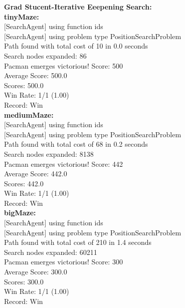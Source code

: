 \documentclass[11pt]{article}
\begin{document}
\newpage
\noindent
\textbf{Grad Stucent-Iterative Eeepening Search:}\\
\textbf{tinyMaze:}\\
$[$SearchAgent$]$ using function ids\\
$[$SearchAgent$]$ using problem type PositionSearchProblem\\
Path found with total cost of 10 in 0.0 seconds\\
Search nodes expanded: 86\\
Pacman emerges victorious! Score: 500\\
Average Score: 500.0\\
Scores:        500.0\\
Win Rate:      1/1 (1.00)\\
Record:        Win\\

\noindent
\textbf{mediumMaze:}\\
$[$SearchAgent$]$ using function ids\\
$[$SearchAgent$]$ using problem type PositionSearchProblem\\
Path found with total cost of 68 in 0.2 seconds\\
Search nodes expanded: 8138\\
Pacman emerges victorious! Score: 442\\
Average Score: 442.0\\
Scores:        442.0\\
Win Rate:      1/1 (1.00)\\
Record:        Win\\

\noindent
\textbf{bigMaze:}\\
$[$SearchAgent$]$ using function ids\\
$[$SearchAgent$]$ using problem type PositionSearchProblem\\
Path found with total cost of 210 in 1.4 seconds\\
Search nodes expanded: 60211\\
Pacman emerges victorious! Score: 300\\
Average Score: 300.0\\
Scores:        300.0\\
Win Rate:      1/1 (1.00)\\
Record:        Win\\
\end{document}
